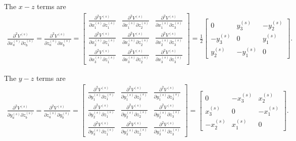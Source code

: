 The $x-z$ terms are
%
\begin{eqnarray}
\frac{\partial^2V^{(s)}}{\partial x_a^{(s)} \partial z_b^{(s)}} = \frac{\partial^2V^{(s)}}{\partial z_a^{(s)} \partial x_b^{(s)}} = 
\begin{bmatrix}
\frac{\partial^2V^{(s)}}{\partial x_1^{(s)} \partial z_1^{(s)}} & \frac{\partial^2V^{(s)}}{\partial x_1^{(s)} \partial z_2^{(s)}}  & \frac{\partial^2V^{(s)}}{\partial x_1^{(s)} \partial z_3^{(s)}} \\
%
\frac{\partial^2V^{(s)}}{\partial x_2^{(s)} \partial z_1^{(s)}} & \frac{\partial^2V^{(s)}}{\partial x_2^{(s)} \partial z_2^{(s)}}  & \frac{\partial^2V^{(s)}}{\partial x_2^{(s)} \partial z_3^{(s)}} \\
%
\frac{\partial^2V^{(s)}}{\partial x_3^{(s)} \partial z_1^{(s)}} & \frac{\partial^2V^{(s)}}{\partial x_3^{(s)} \partial z_2^{(s)}}  & \frac{\partial^2V^{(s)}}{\partial x_3^{(s)} \partial z_3^{(s)}}
\end{bmatrix} =
\frac{1}{2}
\begin{bmatrix}
0 & y_3^{(s)} & -y_2^{(s)} \\
-y_3^{(s)} & 0 & y_1^{(s)} \\
y_2^{(s)} & -y_1^{(s)} & 0
\end{bmatrix}.
\end{eqnarray}
%

The $y-z$ terms are
%
\begin{eqnarray}
\frac{\partial^2V^{(s)}}{\partial y_a^{(s)} \partial z_b^{(s)}} = \frac{\partial^2V^{(s)}}{\partial z_a^{(s)} \partial y_b^{(s)}} = 
\begin{bmatrix}
\frac{\partial^2V^{(s)}}{\partial y_1^{(s)} \partial z_1^{(s)}} & \frac{\partial^2V^{(s)}}{\partial y_1^{(s)} \partial z_2^{(s)}}  & \frac{\partial^2V^{(s)}}{\partial y_1^{(s)} \partial z_3^{(s)}} \\
%
\frac{\partial^2V^{(s)}}{\partial y_2^{(s)} \partial z_1^{(s)}} & \frac{\partial^2V^{(s)}}{\partial y_2^{(s)} \partial z_2^{(s)}}  & \frac{\partial^2V^{(s)}}{\partial y_2^{(s)} \partial z_3^{(s)}} \\
%
\frac{\partial^2V^{(s)}}{\partial y_3^{(s)} \partial z_1^{(s)}} & \frac{\partial^2V^{(s)}}{\partial y_3^{(s)} \partial z_2^{(s)}}  & \frac{\partial^2V^{(s)}}{\partial y_3^{(s)} \partial z_3^{(s)}}
\end{bmatrix} =
\begin{bmatrix}
0 & -x_3^{(s)} & x_2^{(s)} \\
x_3^{(s)} & 0 & -x_1^{(s)} \\
-x_2^{(s)} & x_1^{(s)} & 0
\end{bmatrix}.
\end{eqnarray}
